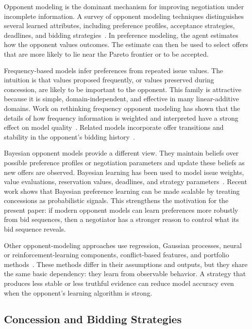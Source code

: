 \documentclass[runningheads]{llncs}
\begin{document}
Opponent modeling is the dominant mechanism for improving negotiation under incomplete information. A survey of opponent modeling techniques distinguishes several learned attributes, including preference profiles, acceptance strategies, deadlines, and bidding strategies~\cite{survey_opponentmodel}. In preference modeling, the agent estimates how the opponent values outcomes. The estimate can then be used to select offers that are more likely to lie near the Pareto frontier or to be accepted.

Frequency-based models infer preferences from repeated issue values. The intuition is that values proposed frequently, or values preserved during concession, are likely to be important to the opponent. This family is attractive because it is simple, domain-independent, and effective in many linear-additive domains. Work on rethinking frequency opponent modeling has shown that the details of how frequency information is weighted and interpreted have a strong effect on model quality~\cite{rethinkfrequency}. Related models incorporate offer transitions and stability in the opponent's bidding history~\cite{om_frequencey_fujita}.

Bayesian opponent models provide a different view. They maintain beliefs over possible preference profiles or negotiation parameters and update these beliefs as new offers are observed. Bayesian learning has been used to model issue weights, value evaluations, reservation values, deadlines, and strategy parameters~\cite{omBayesian,bayesian_startegy_Yu2013}. Recent work shows that Bayesian preference learning can be made scalable by treating concessions as probabilistic signals. This strengthens the motivation for the present paper: if modern opponent models can learn preferences more robustly from bid sequences, then a negotiator has a stronger reason to control what its bid sequence reveals.

Other opponent-modeling approaches use regression, Gaussian processes, neural or reinforcement-learning components, conflict-based features, and portfolio methods~\cite{IAMhaggler2011}. These methods differ in their assumptions and outputs, but they share the same basic dependency: they learn from observable behavior. A strategy that produces less stable or less truthful evidence can reduce model accuracy even when the opponent's learning algorithm is strong.

\subsection{Concession and Bidding Strategies}
\end{document}
